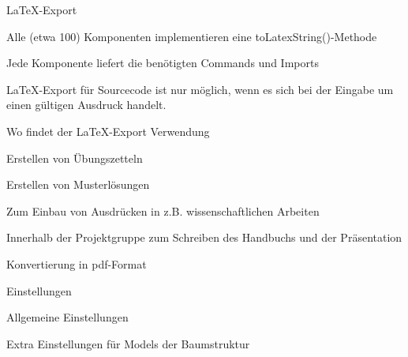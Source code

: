 {
  \begin{itemgroup}{\LaTeX-Export}
    \item Alle (etwa 100) Komponenten implementieren eine toLatexString()-Methode
    \item Jede Komponente liefert die benötigten Commands und Imports
    \item \LaTeX-Export für Sourcecode ist nur möglich, wenn es sich bei
      der Eingabe um einen gültigen Ausdruck handelt.

  \end{itemgroup}
}

{
  \begin{itemgroup}{Wo findet der \LaTeX-Export Verwendung}
    \item Erstellen von Übungszetteln
    \item Erstellen von Musterlösungen
    \item Zum Einbau von Ausdrücken in z.B. wissenschaftlichen Arbeiten
    \item Innerhalb der Projektgruppe zum Schreiben des Handbuchs und der Präsentation
    \item Konvertierung in pdf-Format
  \end{itemgroup}
}

{
  \begin{itemgroup}{Einstellungen}
    \item Allgemeine Einstellungen
    \item Extra Einstellungen für Models der Baumstruktur

  \end{itemgroup}
}
